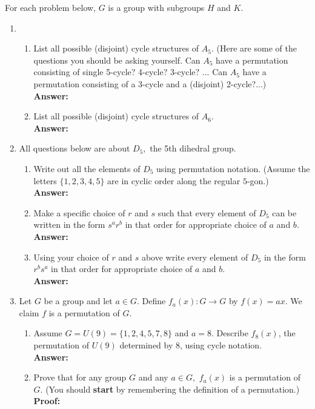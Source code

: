\documentclass[12pt]{article}
\renewcommand{\emph}[1]{\textsf{\textbf{#1}}}
\begin{document}
For each problem below, $G$ is a group with subgroups $H$ and $K.$\\
\begin{enumerate}
\item 
	\begin{enumerate}
	\item List all possible (disjoint) cycle structures of $A_5.$ (Here are some of the questions you should be asking  yourself. Can $A_5$ have a permutation consisting of single 5-cycle? 4-cycle? 3-cycle? ... Can $A_5$ have a permutation consisting of a 3-cycle and a (disjoint) 2-cycle?...)\\
	\textbf{Answer:}
	\vfill
	\item List all possible (disjoint) cycle structures of $A_6.$\\
	\textbf{Answer:}
	\vfill
	\end{enumerate}
	\newpage
	
\item All questions below are about $D_5,$ the 5th dihedral group.
	\begin{enumerate}
	\item Write out all the elements of $D_5$ using permutation notation. (Assume the letters $\{1,2,3,4,5\}$ are in cyclic order along the regular $5$-gon.)\\
	\textbf{Answer:}
	\vfill
	\item Make a specific choice of $r$ and $s$ such that every element of $D_5$ can be written in the form $s^ar^b$ in that order for appropriate choice of $a$ and $b.$\\
	\textbf{Answer:}
	\vfill
	\item Using your choice of $r$ and $s$ above write every element of $D_5$  in the form $r^bs^a$ in that order for appropriate choice of $a$ and $b.$\\
	\textbf{Answer:}
	\vfill
	\end{enumerate}
\newpage

\item Let $G$ be a group and let $a \in G.$ Define $f_a(x): G \to G$ by $f(x)=ax.$ We claim $f$ is a permutation of $G.$
	\begin{enumerate}
	\item Assume $G=U(9)=\{1,2,4,5,7,8\}$ and $a=8.$ Describe $f_8(x)$, the permutation of $U(9)$ determined by $8$, using cycle notation.\\
	 \textbf{Answer:}
	\vfill
	\item Prove that for any group $G$ and any $a \in G,$ $f_a(x)$ is a permutation of $G.$ (You should \emph{start} by remembering the definition of a permutation.)\\
	\textbf{Proof:}
	\vfill
	\end{enumerate}
\newpage


\end{enumerate}
\end{document}
